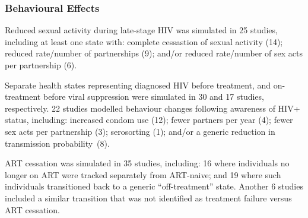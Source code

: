 \subsubsection{Behavioural Effects}\label{sr.res.f.behav}
Reduced sexual activity during late-stage HIV was simulated in 25 studies,
including at least one state with:
complete cessastion of sexual activity (14);
reduced rate/number of partnerships (9); and/or
reduced rate/number of sex acts per partnership (6).
\par
Separate health states representing diagnosed HIV before treatment,
and on-treatment before viral suppression were simulated in
30 and 17 studies, respectively.
22 studies modelled behaviour changes following awareness of HIV+ status, including:
increased condom use (12);
fewer partners per year (4);
fewer sex acts per partnership (3);
serosorting (1); and/or
a generic reduction in transmission probability~(8).
\par
ART cessation was simulated in 35 studies, including:
16 where individuals no longer on ART were tracked separately from ART-naive; and
19 where such individuals transitioned back to a generic ``off-treatment'' state.
Another 6 studies included a similar transition
that was not identified as treatment failure versus ART cessation.
